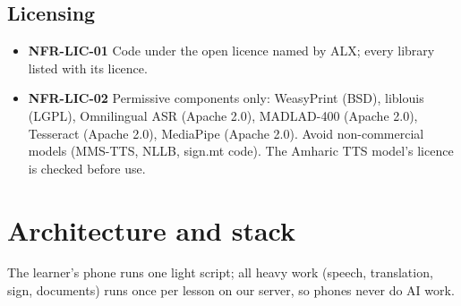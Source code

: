 \documentclass[11pt,a4paper]{article}
\newcommand{\req}[1]{\textbf{#1}}
\begin{document}
\subsection{Licensing}
\begin{itemize}
  \item \req{NFR-LIC-01} Code under the open licence named by ALX; every library listed with its licence.
  \item \req{NFR-LIC-02} Permissive components only: WeasyPrint (BSD), liblouis (LGPL), Omnilingual ASR (Apache 2.0), MADLAD-400 (Apache 2.0), Tesseract (Apache 2.0), MediaPipe (Apache 2.0). Avoid non-commercial models (MMS-TTS, NLLB, sign.mt code). The Amharic TTS model's licence is checked before use.
\end{itemize}

\section{Architecture and stack}

The learner's phone runs one light script; all heavy work (speech, translation, sign, documents) runs once per lesson on our server, so phones never do AI work.
\end{document}
